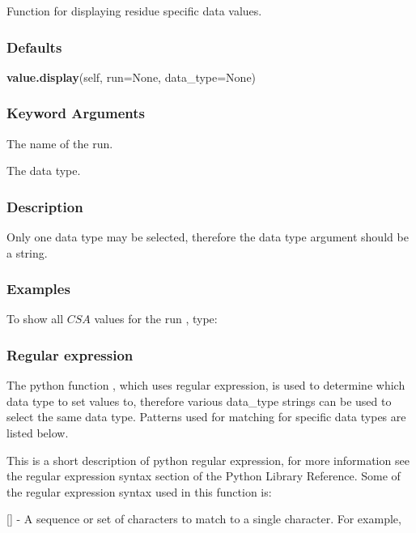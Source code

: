 Function for displaying residue specific data values.

\subsubsection{Defaults}

\textsf{\textbf{value.display}(self, run=None, data\_type=None)}


\subsubsection{Keyword Arguments}


  The name of the run.

  The data type.

\subsubsection{Description}

Only one data type may be selected, therefore the data type argument should be a string.


\subsubsection{Examples}

To show all $CSA$ values for the run 
, type:






\subsubsection{Regular expression}

The python function 
, which uses regular expression, is used to determine which data
type to set values to, therefore various data\_type strings can be used to select the same
data type.  Patterns used for matching for specific data types are listed below.

This is a short description of python regular expression, for more information see the
regular expression syntax section of the Python Library Reference.  Some of the regular
expression syntax used in this function is:

    [] - A sequence or set of characters to match to a single character.  For example,
    
